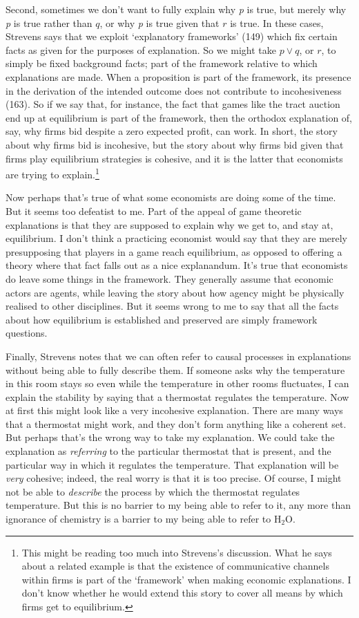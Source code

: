 \documentclass[
  10pt,
  letterpaper,
  DIV=11,
  numbers=noendperiod,
  twoside]{scrartcl}
\begin{document}
Second, sometimes we don't want to fully explain why \emph{p} is true,
but merely why \emph{p} is true rather than \(q\), or why \emph{p} is
true given that \(r\) is true. In these cases, Strevens says that we
exploit `explanatory frameworks' (149) which fix certain facts as given
for the purposes of explanation. So we might take \(p \vee q\), or
\(r\), to simply be fixed background facts; part of the framework
relative to which explanations are made. When a proposition is part of
the framework, its presence in the derivation of the intended outcome
does not contribute to incohesiveness (163). So if we say that, for
instance, the fact that games like the tract auction end up at
equilibrium is part of the framework, then the orthodox explanation of,
say, why firms bid despite a zero expected profit, can work. In short,
the story about why firms bid is incohesive, but the story about why
firms bid given that firms play equilibrium strategies is cohesive, and
it is the latter that economists are trying to explain.\footnote{This
  might be reading too much into Strevens's discussion. What he says
  about a related example is that the existence of communicative
  channels within firms is part of the `framework' when making economic
  explanations. I don't know whether he would extend this story to cover
  all means by which firms get to equilibrium.}

Now perhaps that's true of what some economists are doing some of the
time. But it seems too defeatist to me. Part of the appeal of game
theoretic explanations is that they are supposed to explain why we get
to, and stay at, equilibrium. I don't think a practicing economist would
say that they are merely presupposing that players in a game reach
equilibrium, as opposed to offering a theory where that fact falls out
as a nice explanandum. It's true that economists do leave some things in
the framework. They generally assume that economic actors are agents,
while leaving the story about how agency might be physically realised to
other disciplines. But it seems wrong to me to say that all the facts
about how equilibrium is established and preserved are simply framework
questions.

Finally, Strevens notes that we can often refer to causal processes in
explanations without being able to fully describe them. If someone asks
why the temperature in this room stays so even while the temperature in
other rooms fluctuates, I can explain the stability by saying that a
thermostat regulates the temperature. Now at first this might look like
a very incohesive explanation. There are many ways that a thermostat
might work, and they don't form anything like a coherent set. But
perhaps that's the wrong way to take my explanation. We could take the
explanation as \emph{referring} to the particular thermostat that is
present, and the particular way in which it regulates the temperature.
That explanation will be \emph{very} cohesive; indeed, the real worry is
that it is too precise. Of course, I might not be able to
\emph{describe} the process by which the thermostat regulates
temperature. But this is no barrier to my being able to refer to it, any
more than ignorance of chemistry is a barrier to my being able to refer
to H\(_2\)O.
\end{document}
